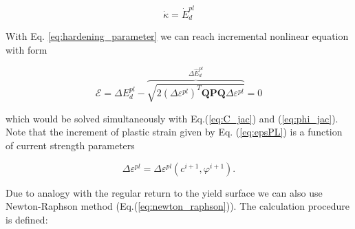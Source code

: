 \begin{equation}\label{eq:hardening_parameter}
	\dot{\kappa} = \dot{E}_d^{pl}
\end{equation}

With Eq. \ref{eq:hardening_parameter} we can reach incremental nonlinear equation with form

\begin{equation}
	\mathcal{E} = \Delta E_d^{pl} - \overbrace{\sqrt{2(\Delta \varepsilon^{pl})^T \textbf{QPQ}\Delta\varepsilon^{pl}} }^{\Delta \hat{E}_d^{pl}}=0
\end{equation}

which would be solved simultaneously with Eq.(\ref{eq:C_jac}) and (\ref{eq:phi_jac}). Note that the increment of plastic strain given by Eq. (\ref{eq:epsPL}) is a function of current strength parameters

\begin{equation}
	\Delta\varepsilon^{pl} = \Delta\varepsilon^{pl} (c^{i+1}, \varphi^{i+1}).
\end{equation}

Due to analogy with the regular return to the yield surface we can also use Newton-Raphson method (Eq.(\ref{eq:newton_raphson})). The calculation procedure is defined:

